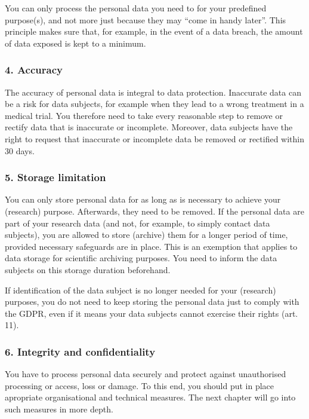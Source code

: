\documentclass[
]{book}
\begin{document}
You can only process the personal data you need to for your predefined purpose(s),
and not more just because they may ``come in handy later''. This principle makes
sure that, for example, in the event of a data breach, the amount of data exposed
is kept to a minimum.

\hypertarget{accuracy}{%
\subsubsection{4. Accuracy}\label{accuracy}}

The accuracy of personal data is integral to data protection. Inaccurate data
can be a risk for data subjects, for example when they lead to a wrong treatment
in a medical trial. You therefore need to take every reasonable step to remove
or rectify data that is inaccurate or incomplete. Moreover, data subjects have
the right to request that inaccurate or
incomplete data be removed or rectified within 30 days.

\hypertarget{storage-limitation}{%
\subsubsection{5. Storage limitation}\label{storage-limitation}}

You can only store personal data for as long as is necessary to achieve your
(research) purpose. Afterwards, they need to be removed. If the personal data
are part of your research data (and not, for example, to simply contact data
subjects), you are allowed to store (archive) them for a longer period of time,
provided necessary safeguards are in place. This is an exemption that applies to
data storage for scientific archiving purposes. You need to inform the data
subjects on this storage duration beforehand.

If identification of the data subject is no longer needed for your
(research) purposes, you do not need to keep storing the personal data just
to comply with the GDPR, even if it means your data subjects cannot exercise
their rights (art. 11).

\hypertarget{integrity-and-confidentiality}{%
\subsubsection{6. Integrity and confidentiality}\label{integrity-and-confidentiality}}

You have to process personal data securely and protect against unauthorised
processing or access, loss or damage. To this end, you should put in place
apropriate organisational and technical measures. The next chapter
will go into such measures in more depth.
\end{document}
